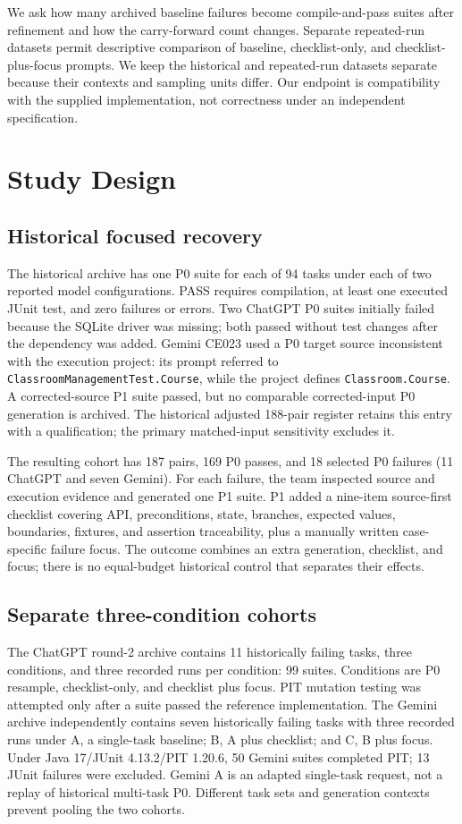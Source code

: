 \documentclass[conference]{IEEEtran}
\begin{document}
We ask how many archived baseline failures become compile-and-pass suites after refinement and how the carry-forward count changes. Separate repeated-run datasets permit descriptive comparison of baseline, checklist-only, and checklist-plus-focus prompts. We keep the historical and repeated-run datasets separate because their contexts and sampling units differ. Our endpoint is compatibility with the supplied implementation, not correctness under an independent specification.

\section{Study Design}
\subsection{Historical focused recovery}
The historical archive has one P0 suite for each of 94 tasks under each of two reported model configurations. PASS requires compilation, at least one executed JUnit test, and zero failures or errors. Two ChatGPT P0 suites initially failed because the SQLite driver was missing; both passed without test changes after the dependency was added. Gemini CE023 used a P0 target source inconsistent with the execution project: its prompt referred to \texttt{ClassroomManagementTest.Course}, while the project defines \texttt{Classroom.Course}. A corrected-source P1 suite passed, but no comparable corrected-input P0 generation is archived. The historical adjusted 188-pair register retains this entry with a qualification; the primary matched-input sensitivity excludes it.

The resulting cohort has 187 pairs, 169 P0 passes, and 18 selected P0 failures (11 ChatGPT and seven Gemini). For each failure, the team inspected source and execution evidence and generated one P1 suite. P1 added a nine-item source-first checklist covering API, preconditions, state, branches, expected values, boundaries, fixtures, and assertion traceability, plus a manually written case-specific failure focus. The outcome combines an extra generation, checklist, and focus; there is no equal-budget historical control that separates their effects.

\subsection{Separate three-condition cohorts}
The ChatGPT round-2 archive contains 11 historically failing tasks, three conditions, and three recorded runs per condition: 99 suites. Conditions are P0 resample, checklist-only, and checklist plus focus. PIT mutation testing was attempted only after a suite passed the reference implementation. The Gemini archive independently contains seven historically failing tasks with three recorded runs under A, a single-task baseline; B, A plus checklist; and C, B plus focus. Under Java 17/JUnit 4.13.2/PIT 1.20.6, 50 Gemini suites completed PIT; 13 JUnit failures were excluded. Gemini A is an adapted single-task request, not a replay of historical multi-task P0. Different task sets and generation contexts prevent pooling the two cohorts.
\end{document}
